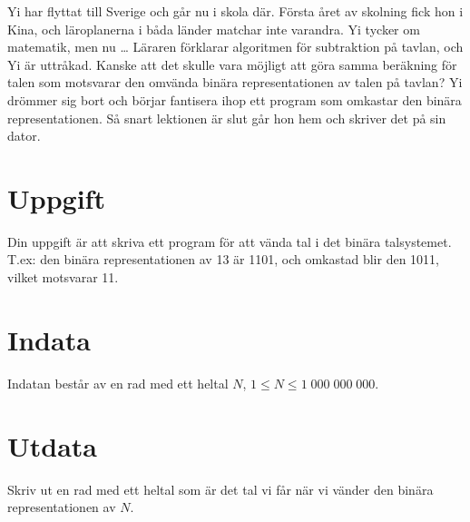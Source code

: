 
Yi har flyttat till Sverige och går nu i skola där. Första året 
av skolning fick hon i Kina, och läroplanerna i båda länder matchar
inte varandra. Yi tycker om matematik, men nu \dots{} Läraren 
förklarar algoritmen för subtraktion på tavlan, och Yi är uttråkad.
Kanske att det skulle vara möjligt att göra samma beräkning för
talen som motsvarar den omvända binära representationen av 
talen på tavlan? Yi drömmer sig bort och börjar fantisera ihop
ett program som omkastar den binära representationen. Så snart
lektionen är slut går hon hem och skriver det på sin dator.

\section*{Uppgift}
Din uppgift är att skriva ett program för att vända tal i 
det binära talsystemet. T.ex: den binära representationen av
13 är 1101, och omkastad blir den 1011, vilket motsvarar 11.

\section*{Indata}
Indatan består av en rad med ett heltal $N$, $1 \leq N \leq 1\;000\;000\;000$.

\section*{Utdata}
Skriv ut en rad med ett heltal som är det tal vi får när vi vänder den
binära representationen av $N$.
